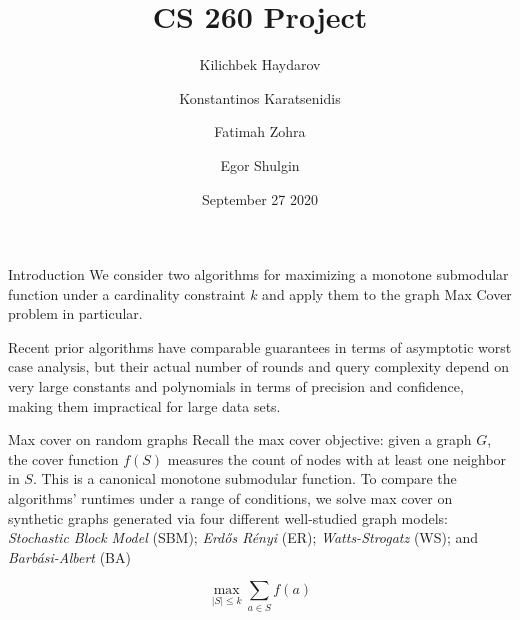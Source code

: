 \documentclass{beamer} %
\title{CS 260 Project}
\author{Kilichbek Haydarov \and Konstantinos Karatsenidis \and \text{Grigory Malinovsky} \and Fatimah Zohra \and Egor Shulgin}
\institute[shortinst]{Fast and Tranquil team}
\date{September 27 2020}
\begin{document}
\begin{frame}
\titlepage
\end{frame}

\begin{frame}{Introduction}
We consider two algorithms for maximizing a monotone submodular function under a cardinality constraint $k$ and apply them to the graph Max Cover problem in particular.

Recent prior algorithms have comparable guarantees in terms of asymptotic worst case analysis, but their actual number of rounds and query complexity depend on very large constants and polynomials in terms of precision and confidence, making them impractical for large data sets.
\end{frame}

\begin{frame}{Max cover on random graphs} %
Recall the max cover objective: given a graph $G$, the cover function $f(S)$ measures the count of nodes with at least one neighbor in $S$. This is a canonical monotone submodular function. To compare the algorithms’ runtimes under a range of conditions, we solve max cover on synthetic graphs generated via four different well-studied graph models:
\emph{Stochastic Block Model} (SBM); \emph{Erd\H{o}s R\'{e}nyi} (ER); \emph{Watts-Strogatz} (WS); and \emph{Barb\'{a}si-Albert} (BA)

\[\max _{|S| \leq k} \sum_{a \in S} f(a)\]
\end{frame}
\end{document}
